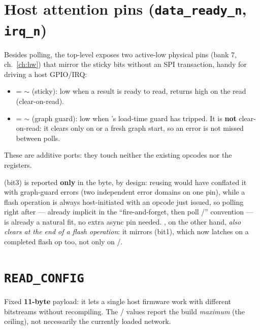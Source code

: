 \section{Host attention pins (\texttt{data\_ready\_n}, \texttt{irq\_n})}
Besides  polling, the top-level exposes two active-low physical pins (bank 7,
ch.~\ref{ch:hw}) that mirror the sticky bits without an SPI transaction, handy for driving
a host GPIO/IRQ:
\begin{itemize}
\item {} = $\sim$ (sticky): low when a result is ready
to read, returns high on the  read (clear-on-read).
\item {} = $\sim$ (graph guard): low when 's
load-time guard has tripped. It is \textbf{not} clear-on-read: it clears only on 
or a fresh graph start, so an error is not missed between polls.
\end{itemize}
These are additive ports: they touch neither the existing opcodes nor the registers.

\begin{fnwarn}
 (bit3) is reported \textbf{only} in the  byte, by
design: reusing  would have conflated it with graph-guard errors (two
independent error domains on one pin), while a flash operation is always host-initiated
with an opcode just issued, so polling  right after --- already implicit in the
``fire-and-forget, then poll /'' convention --- is already a
natural fit, no extra async pin needed. , on the other hand,
\emph{also clears at the end of a flash operation}: it mirrors  (bit1),
which now latches on a completed flash op too, not only on /.
\end{fnwarn}

\section{\texttt{READ\_CONFIG}}
\label{sec:readcfg}
Fixed \textbf{11-byte} payload: it lets a single host firmware work with different
bitstreams without recompiling. The / values report the
build \emph{maximum} (the ceiling), not necessarily the currently loaded network.

